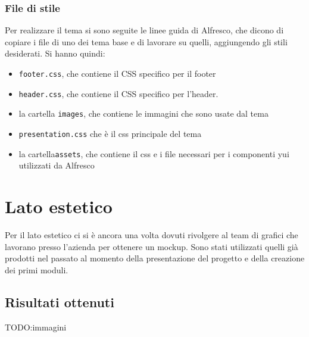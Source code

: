 \subsubsection{File di stile}
Per realizzare il tema si sono seguite le linee guida di Alfresco, che dicono di copiare i file di uno dei tema base e di lavorare su quelli, aggiungendo gli stili desiderati. Si hanno quindi:
\begin{itemize}
\item \texttt{footer.css}, che contiene il CSS specifico per il footer
\item \texttt{header.css}, che contiene il CSS specifico per l'header.
\item la cartella \texttt{images}, che contiene le immagini che sono usate dal tema
\item \texttt{presentation.css} che è il css principale del tema
\item la cartella\texttt{assets}, che contiene il css e i file necessari per i componenti yui utilizzati da Alfresco
\end{itemize}
\section{Lato estetico}
Per il lato estetico ci si è ancora una volta dovuti rivolgere al team di grafici che lavorano presso l'azienda per ottenere un mockup. Sono stati utilizzati quelli già prodotti nel passato al momento della presentazione del progetto e della creazione dei primi moduli.
\subsection{Risultati ottenuti}
TODO:immagini